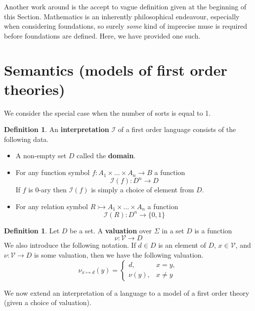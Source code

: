\documentclass[12pt]{article}
\theoremstyle{plain}
\theoremstyle{definition}
\newtheorem{defn}[thm]{Definition} %
\newcommand{\call}[1]{\mathcal{#1}}
\newcommand{\lto}{\longrightarrow}
\begin{document}
	Another work around is the accept to vague definition given at the beginning of this Section. Mathematics is an inherently philosophical endeavour, especially when considering foundations, so surely \emph{some} kind of imprecise muse is required before foundations are defined. Here, we have provided one such.
	
	\section{Semantics (models of first order theories)}\label{sec:models}
	We consider the special case when the number of sorts is equal to 1.
	\begin{defn}
		An \textbf{interpretation} $\call{I}$ of a first order language consists of the following data.
		\begin{itemize}
			\item A non-empty set $D$ called the \textbf{domain}.
			\item For any function symbol $f: A_1 \times \hdots \times A_n \lto B$ a function
			\begin{equation}
				\call{I}(f): D^n \lto D
			\end{equation}
			If $f$ is $0$-ary then $\call{I}(f)$ is simply a choice of element from $D$.
			\item For any relation symbol $R \rightarrowtail A_1 \times \hdots \times A_n$ a function
			\begin{equation}
				\call{I}(R): D^n \lto \lbrace 0,1\rbrace
			\end{equation}
		\end{itemize}
	\end{defn}
	
	\begin{defn}
		Let $D$ be a set. A \textbf{valuation} over $\Sigma$ in a set $D$ is a function
		\begin{equation}
			\nu: \call{V} \lto D
		\end{equation}
		We also introduce the following notation. If $d \in D$ is an element of $D$, $x \in \call{V}$, and $\nu: \call{V} \lto D$ is some valuation, then we have the following valuation.
		\begin{equation}
			\nu_{x \mapsto d}(y) =
			\begin{cases}
				d, & x = y,\\
				\nu(y), & x \neq y
			\end{cases}
		\end{equation}
	\end{defn}
	We now extend an interpretation of a language to a model of a first order theory (given a choice of valuation).
	
\end{document}
